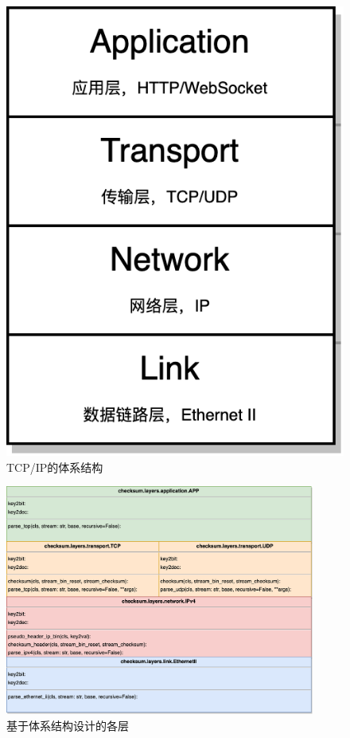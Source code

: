 \documentclass[a4paper,11pt]{article}
\begin{document}
\begin{spacing}{1.2}
\begin{CJK}{UTF8}{gbsn}
\begin{figure}[htbp]
    \centering
    \includegraphics[scale=1.4]{i-4.png}
    \caption{TCP/IP的体系结构}
\end{figure}

\newpage

\begin{figure}[htbp]
    \centering
    \includegraphics[height=20.4em]{i-class.png}
    \caption{基于体系结构设计的各层}
\end{figure}


\end{CJK}
\end{spacing}
\end{document}
